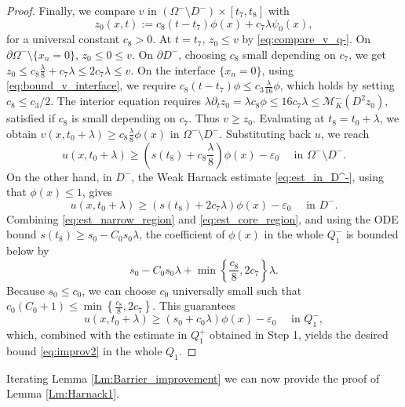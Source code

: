 \documentclass[12pt]{article}
\numberwithin{Theorem}{section}
\theoremstyle{definition}
\theoremstyle{remark}
\numberwithin{equation}{section}
\newcommand{\p}{\partial}
\newcommand{\eps}{\varepsilon}
\begin{document}
\begin{proof}
Finally, we compare $v$ in $(\Omega^- \setminus D^-) \times [t_7,t_8]$ with
\[
z_0(x,t) := c_8(t-t_7) \phi(x) + c_7 \lambda \psi_0(x),
\]
for a universal constant $c_8 > 0$. At $t=t_7$, $z_0 \leq v$ by \eqref{eq:compare_v_q-}. On $\p \Omega^- \setminus \{ x_n=0\}$, $z_0 \leq 0 \leq v$. On $\p D^-$, choosing $c_8$ small depending on $c_7$, we get $z_0 \leq c_8 \frac{\lambda}{8} + c_7 \lambda \leq 2c_7\lambda \leq v$. On the interface $\{ x_n=0\}$, using \eqref{eq:bound_v_interface}, we require $c_8(t-t_7)\phi \leq c_3 \frac{\lambda}{16}\phi$, which holds by setting $c_8 \leq c_3/2$.
The interior equation requires $\lambda \p_t z_0 = \lambda c_8 \phi \le 16 c_7 \lambda \le \mathcal M_K^- (D^2 z_0)$, satisfied if $c_8$ is small depending on $c_7$. 
Thus $v \ge z_0$. Evaluating at $t_8 = t_0+\lambda$, we obtain $v(x,t_0+\lambda) \geq c_8\frac{\lambda}{8}\phi(x)$ in $\Omega^- \setminus D^-$. Substituting back $u$, we reach
\begin{equation} \label{eq:est_narrow_region}
u(x,t_0+\lambda) \geq \left( s(t_8) + c_8\frac{\lambda}{8}\right)\phi(x) - \eps_0 \quad \text{ in }\Omega^- \setminus D^-.
\end{equation}
On the other hand, in $D^-$, the Weak Harnack estimate \eqref{eq:est_in_D^-}, using that $\phi(x) \leq 1$, gives  
\begin{equation} \label{eq:est_core_region}
u(x,t_0+\lambda) \geq \left( s(t_8) + 2c_7\lambda\right)\phi(x) - \eps_0 \quad \text{ in } D^-.
\end{equation}
Combining \eqref{eq:est_narrow_region} and \eqref{eq:est_core_region}, and using the ODE bound $s(t_8) \geq s_0 - C_0 s_0 \lambda$, the coefficient of $\phi(x)$ in the whole $Q_1^-$ is bounded below by 
\[
s_0 - C_0 s_0 \lambda + \min\left\{ \frac{c_8}{8}, 2c_7 \right\} \lambda.
\]
Because $s_0 \leq c_0$, we can choose $c_0$ universally small such that $c_0(C_0 + 1) \leq \min\left\{ \frac{c_8}{8}, 2c_7 \right\}$. This guarantees 
\[
u(x,t_0+\lambda) \geq (s_0 + c_0 \lambda)\phi(x) - \eps_0 \quad \text{ in } Q_1^-,
\]
which, combined with the estimate in $Q_1^+$ obtained in Step 1, yields the desired bound \eqref{eq:improv2} in the whole $Q_1$.

     \end{proof}

Iterating Lemma \ref{Lm:Barrier_improvement} we can now provide the proof of Lemma \ref{Lm:Harnack1}.
\end{document}

